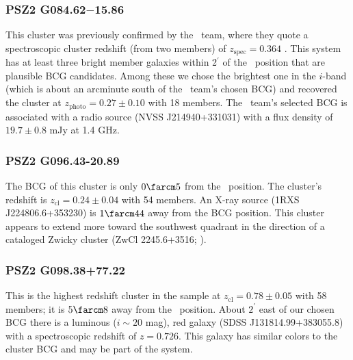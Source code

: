 \documentclass[apj, revtex4-1]{emulateapj}
\begin{document}
\subsubsection{PSZ2 G084.62$-$15.86} %
This cluster was previously confirmed by the \planck\ team, where they quote a spectroscopic cluster redshift (from two members) of $z_\mathrm{spec} = 0.364$ \citep{PlanckCollaboration2016a}.
This system has at least three bright member galaxies within 2$^\prime$ of the \planck\ position that are plausible BCG candidates. Among these we chose the brightest one in the $i$-band (which is about an arcminute south of the \planck\ team's chosen BCG) and recovered the cluster at $z_\mathrm{photo} = 0.27 \pm 0.10$ with 18 members.
The \planck\ team's selected BCG is associated with a radio source (NVSS J214940+331031) with a flux density of $19.7\pm 0.8$ mJy at 1.4 GHz.

\subsubsection{PSZ2 G096.43-20.89} %
The BCG of this cluster is only $0\farcm5$ from the \planck\ position. The cluster's redshift is $z_\mathrm{cl} = 0.24 \pm 0.04$ with 54 members. An X-ray source (1RXS J224806.6+353230) is $1\farcm44$ away from the BCG position. This cluster appears to extend more toward the southwest quadrant in the direction of a cataloged Zwicky cluster (ZwCl 2245.6+3516; \citealt{Zwicky1968}).

\subsubsection{PSZ2 G098.38+77.22} %
This is the highest redshift cluster in the sample at $z_\mathrm{cl} = 0.78 \pm 0.05$ with 58 members; it is $5\farcm8$ away from the \planck\ position. About $2^\prime$ east of our chosen BCG there is a luminous ($i\sim 20$ mag), red galaxy (SDSS J131814.99+383055.8) with a spectroscopic redshift of $z=0.726$. This galaxy has similar colors to the cluster BCG and may be part of the system.
\end{document}
